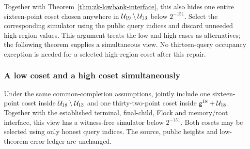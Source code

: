 Together with Theorem~\ref{thm:zk-lowbank-interface}, this also hides one entire sixteen-point coset chosen anywhere in $\mathcal{U}_{19}\setminus\mathcal{U}_{13}$ below $2^{-151}$. Select the corresponding simulator using the public query indices and discard unneeded high-region values. This argument treats the low and high cases as alternatives; the following theorem supplies a simultaneous view. No thirteen-query occupancy exception is needed for a selected high-region coset after this repair.

\subsubsection{A low coset and a high coset simultaneously}

\begin{theorem}\label{thm:zk-split-region-interface}
Under the same common-completion assumptions, jointly include one sixteen-point coset inside $\mathcal{U}_{18}\setminus\mathcal{U}_{13}$ and one thirty-two-point coset inside $\mathsf{g}^{18}+\mathcal{U}_{18}$. Together with the established terminal, final-child, Flock and memory/root interface, this view has a witness-free simulator below $2^{-151}$. Both cosets may be selected using only honest query indices. The source, public heights and low-theorem error ledger are unchanged.
\end{theorem}
